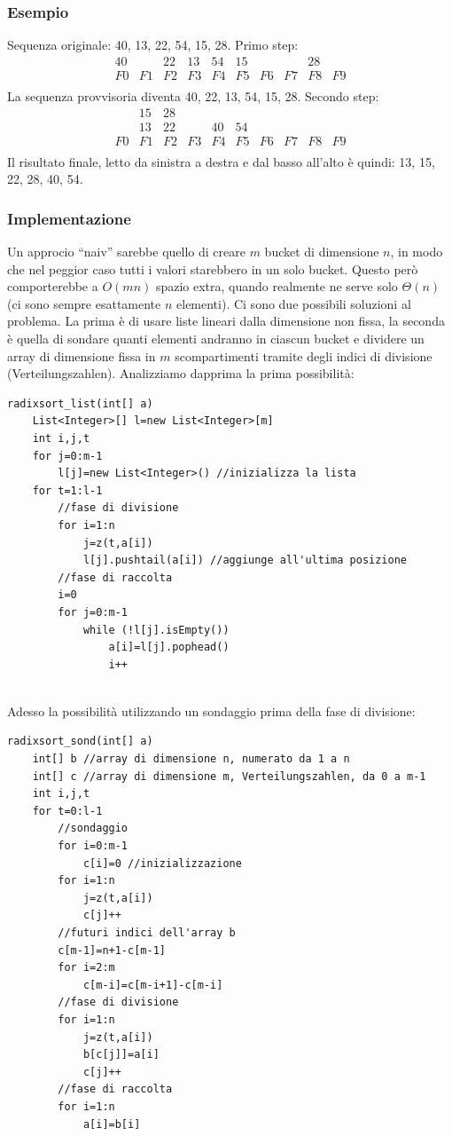 \documentclass[a4paper]{book}
\newcommand{\lstIndent}{4}
\begin{document}
\subsubsection*{Esempio}
Sequenza originale: 40, 13, 22, 54, 15, 28. Primo step:    
\[\begin{array}{*{20}{c}}
{40}&{ }&{22}&{13}&{54}&{15}&{ }&{ }&{28}&{ }\\
{F0}&{F1}&{F2}&{F3}&{F4}&{F5}&{F6}&{F7}&{F8}&{F9}\\
\end{array}\]
La sequenza provvisoria diventa 40, 22, 13, 54, 15, 28. Secondo step:
\[\begin{array}{*{20}{c}}
{ }&{15}&{28}&{ }&{ }&{ }&{ }&{ }&{ }&{ }\\
{ }&{13}&{22}&{ }&{40}&{54}&{ }&{ }&{ }&{ }\\
{F0}&{F1}&{F2}&{F3}&{F4}&{F5}&{F6}&{F7}&{F8}&{F9}\\
\end{array}\]
Il risultato finale, letto da sinistra a destra e dal basso all'alto è quindi: 13, 15, 22, 28, 40, 54.
\subsubsection*{Implementazione}
Un approcio ``naiv'' sarebbe quello di creare $m$ bucket di dimensione $n$, in modo che nel peggior caso tutti i valori starebbero in un solo bucket. Questo però comporterebbe a $O(mn)$ spazio extra, quando realmente ne serve solo $\Theta (n)$ (ci sono sempre esattamente $n$ elementi). Ci sono due possibili soluzioni al problema. La prima è di usare liste lineari dalla dimensione non fissa, la seconda è quella di sondare quanti elementi andranno in ciascun bucket e dividere un array di dimensione fissa in $m$ scompartimenti tramite degli indici di divisione (Verteilungszahlen). Analizziamo dapprima la prima possibilità:
\begin{lstlisting}[tabsize=\lstIndent]
radixsort_list(int[] a)
	List<Integer>[] l=new List<Integer>[m]
	int i,j,t
	for j=0:m-1
		l[j]=new List<Integer>() //inizializza la lista
	for t=1:l-1
		//fase di divisione
		for i=1:n
			j=z(t,a[i])
			l[j].pushtail(a[i]) //aggiunge all'ultima posizione
		//fase di raccolta
		i=0
		for j=0:m-1
			while (!l[j].isEmpty())
				a[i]=l[j].pophead()
				i++
				
\end{lstlisting}

\noindent Adesso la possibilità utilizzando un sondaggio prima della fase di divisione:
\begin{lstlisting}[tabsize=\lstIndent]
radixsort_sond(int[] a)
	int[] b //array di dimensione n, numerato da 1 a n
	int[] c //array di dimensione m, Verteilungszahlen, da 0 a m-1
	int i,j,t
	for t=0:l-1
		//sondaggio
		for i=0:m-1
			c[i]=0 //inizializzazione
		for i=1:n
			j=z(t,a[i])
			c[j]++ 
		//futuri indici dell'array b
		c[m-1]=n+1-c[m-1]
		for i=2:m
			c[m-i]=c[m-i+1]-c[m-i]
		//fase di divisione
		for i=1:n
			j=z(t,a[i])
			b[c[j]]=a[i]
			c[j]++
		//fase di raccolta
		for i=1:n
			a[i]=b[i]				
\end{lstlisting}
\end{document}
